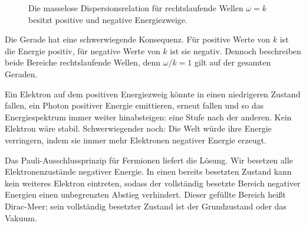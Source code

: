 \begin{figure}[htbp]
\centering
{}
\caption{Die masselose Dispersionsrelation für rechtslaufende Wellen \(\omega=k\) besitzt positive und negative Energiezweige.}
\end{figure}

Die Gerade hat eine schwerwiegende Konsequenz. Für positive Werte von \(k\) ist die Energie positiv, für negative Werte von \(k\) ist sie negativ. Dennoch beschreiben beide Bereiche rechtslaufende Wellen, denn \(\omega/k=1\) gilt auf der gesamten Geraden.

Ein Elektron auf dem positiven Energiezweig könnte in einen niedrigeren Zustand fallen, ein Photon positiver Energie emittieren, erneut fallen und so das Energiespektrum immer weiter hinabsteigen: eine Stufe nach der anderen. Kein Elektron wäre stabil. Schwerwiegender noch: Die Welt würde ihre Energie verringern, indem sie immer mehr Elektronen negativer Energie erzeugt.

Das Pauli-Ausschlussprinzip für Fermionen liefert die Lösung. Wir besetzen alle Elektronenzustände negativer Energie. In einen bereits besetzten Zustand kann kein weiteres Elektron eintreten, sodass der vollständig besetzte Bereich negativer Energien einen unbegrenzten Abstieg verhindert. Dieser gefüllte Bereich heißt Dirac-Meer; sein vollständig besetzter Zustand ist der Grundzustand oder das Vakuum.

\begin{classroomqa}
\end{classroomqa}

